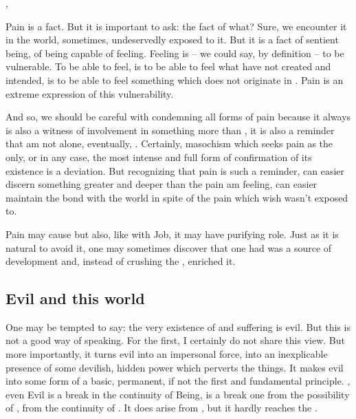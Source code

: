 {\sep

\pa
Pain is a fact. But it is important to ask: the fact of what? Sure, 
we encounter it in the world, sometimes, undeservedly exposed to it. 
But it is a 
fact of sentient being, of being capable of feeling. Feeling is -- we 
could say, by definition -- to be vulnerable. To be able to feel, is 
to be able to feel what  have not created and intended, is to be 
able to feel something which does not originate in . Pain is
an extreme expression of this vulnerability. 

And so, we should be careful with condemning all forms of pain because
it always is also a witness of  involvement in something more
than , it is also a reminder that  am not alone,
eventually, .  Certainly, masochism which seeks pain as 
the only, or in any case, the most intense and full form of
confirmation of its existence is a deviation.  But recognizing that pain is
such a reminder,  can easier discern something greater and
deeper than the pain  am  feeling,  can
easier maintain the bond with the world in spite of the pain which
 wish  wasn't exposed to.

Pain may cause  but also, like with Job, it may have 
purifying role. Just as it is natural to avoid it, one may sometimes 
discover that  one had  was a source of 
 development and, instead of crushing the , 
enriched it.


\subsection{Evil and this world}\label{sub:evilworld}

\pa One may be tempted to say: the very existence of  and
suffering is evil.  But this is not a good way of speaking.  For the
first, I certainly do not share this view.  But more importantly, it
turns evil into an impersonal force, into an inexplicable presence of
some devilish, hidden power which perverts the things.  
It makes evil into some form of a basic, permanent, if not the first 
and fundamental principle. , even  Evil is a break in the continuity 
of Being, is a break  one from the possibility of 
, from the continuity of . It does arise 
from , but it hardly reaches the .

}
